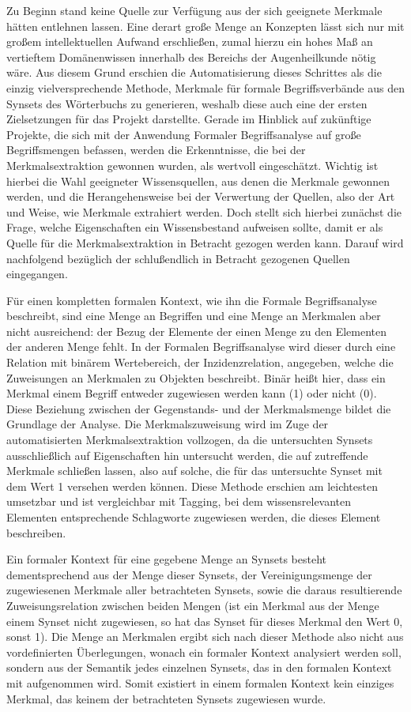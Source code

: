 \documentclass[pagesize,DIV=calc,12pt,draft]{scrreprt}
\begin{document}
Zu Beginn stand keine Quelle zur Verfügung aus der sich geeignete Merkmale hätten entlehnen lassen. 
Eine derart große Menge an Konzepten lässt sich nur mit großem intellektuellen Aufwand erschließen, zumal hierzu ein hohes Maß an vertieftem Domänenwissen innerhalb des Bereichs der Augenheilkunde nötig wäre. 
Aus diesem Grund erschien die Automatisierung dieses Schrittes als die einzig vielversprechende Methode, Merkmale für formale Begriffsverbände aus den Synsets des Wörterbuchs zu generieren, weshalb diese auch eine der ersten Zielsetzungen für das Projekt darstellte. 
Gerade im Hinblick auf zukünftige Projekte, die sich mit der Anwendung Formaler Begriffsanalyse auf große Begriffsmengen befassen, werden die Erkenntnisse, die bei der Merkmalsextraktion gewonnen wurden, als wertvoll eingeschätzt. 
Wichtig ist hierbei die Wahl geeigneter Wissensquellen, aus denen die Merkmale gewonnen werden, und die Herangehensweise bei der Verwertung der Quellen, also der Art und Weise, wie Merkmale extrahiert werden. 
Doch stellt sich hierbei zunächst die Frage, welche Eigenschaften ein Wissensbestand aufweisen sollte, damit er als Quelle für die Merkmalsextraktion in Betracht gezogen werden kann. 
Darauf wird nachfolgend bezüglich der schlußendlich in Betracht gezogenen Quellen eingegangen. 

Für einen kompletten formalen Kontext, wie ihn die Formale Begriffsanalyse beschreibt, sind eine Menge an Begriffen und eine Menge an Merkmalen aber nicht ausreichend: der Bezug der Elemente der einen Menge zu den Elementen der anderen Menge fehlt. 
In der Formalen Begriffsanalyse wird dieser durch eine Relation mit binärem Wertebereich, der Inzidenzrelation, angegeben, welche die Zuweisungen an Merkmalen zu Objekten beschreibt. 
Binär heißt hier, dass ein Merkmal einem Begriff entweder zugewiesen werden kann (1) oder nicht (0). 
Diese Beziehung zwischen der Gegenstands- und der Merkmalsmenge bildet die Grundlage der Analyse. 
Die Merkmalszuweisung wird im Zuge der automatisierten Merkmalsextraktion vollzogen, da die untersuchten Synsets ausschließlich auf Eigenschaften hin untersucht werden, die auf zutreffende Merkmale schließen lassen, also auf solche, die für das untersuchte Synset mit dem Wert 1 versehen werden können. 
Diese Methode erschien am leichtesten umsetzbar und ist vergleichbar mit Tagging, bei dem wissensrelevanten Elementen entsprechende Schlagworte zugewiesen werden, die dieses Element beschreiben. 

Ein formaler Kontext für eine gegebene Menge an Synsets besteht dementsprechend aus der Menge dieser Synsets, der Vereinigungsmenge der zugewiesenen Merkmale aller betrachteten Synsets, sowie die daraus resultierende Zuweisungsrelation zwischen beiden Mengen (ist ein Merkmal aus der Menge einem Synset nicht zugewiesen, so hat das Synset für dieses Merkmal den Wert 0, sonst 1). 
Die Menge an Merkmalen ergibt sich nach dieser Methode also nicht aus vordefinierten Überlegungen, wonach ein formaler Kontext analysiert werden soll, sondern aus der Semantik jedes einzelnen Synsets, das in den formalen Kontext mit aufgenommen wird. 
Somit existiert in einem formalen Kontext kein einziges Merkmal, das keinem der betrachteten Synsets zugewiesen wurde. 
\end{document}
